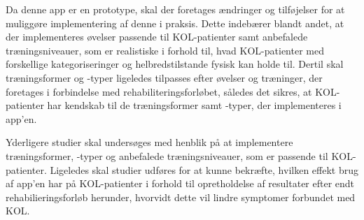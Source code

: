 Da denne app er en prototype, skal der foretages ændringer og tilføjelser for at muliggøre implementering af denne i praksis. Dette indebærer blandt andet, at der implementeres øvelser passende til KOL-patienter samt anbefalede træningsniveauer, som er realistiske i forhold til, hvad KOL-patienter med forskellige kategoriseringer og helbredstilstande fysisk kan holde til. Dertil skal træningsformer og -typer ligeledes tilpasses efter øvelser og træninger, der foretages i forbindelse med rehabiliteringsforløbet, således det sikres, at KOL-patienter har kendskab til de træningsformer samt -typer, der implementeres i app’en. 

Yderligere studier skal undersøges med henblik på at implementere træningsformer, -typer og anbefalede træningsniveauer, som er passende til KOL-patienter. Ligeledes skal studier udføres for at kunne bekræfte, hvilken effekt brug af app’en har på KOL-patienter i forhold til opretholdelse af resultater efter endt rehabilieringsforløb herunder, hvorvidt dette vil lindre symptomer forbundet med KOL. 